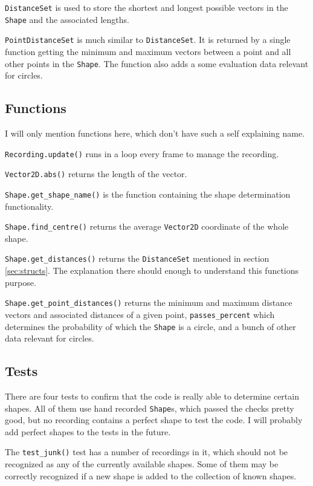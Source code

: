 \documentclass[12pt, a4paper]{article}
\begin{document}
{                \texttt{DistanceSet} is used to store the shortest and longest possible vectors in the \texttt{Shape} and the associated lengths.\break

                \texttt{PointDistanceSet} is much similar to \texttt{DistanceSet}. It is returned by a single function getting the minimum and maximum vectors between a point and all other points in the \texttt{Shape}. The function also adds a some evaluation data relevant for circles.

            \subsection{Functions}
                I will only mention functions here, which don't have such a self explaining name.\break

                \texttt{Recording.update()} runs in a loop every frame to manage the recording.\break

                \texttt{Vector2D.abs()} returns the length of the vector.\break

                \texttt{Shape.get\_shape\_name()} is the function containing the shape determination functionality.\break

                \texttt{Shape.find\_centre()} returns the average \texttt{Vector2D} coordinate of the whole shape.\break

                \texttt{Shape.get\_distances()} returns the \texttt{DistanceSet} mentioned in section \ref{sec:structs}. The explanation there should enough to understand this functions purpose.\break

                \texttt{Shape.get\_point\_distances()} returns the minimum and maximum distance vectors and associated distances of a given point, \texttt{passes\_percent} which determines the probability of which the \texttt{Shape} is a circle, and a bunch of other data relevant for circles.

        }
        \subsection{Tests}
            There are four tests to confirm that the code is really able to determine certain shapes. All of them use hand recorded \texttt{Shape}s, which passed the checks pretty good, but no recording contains a perfect shape to test the code. I will probably add perfect shapes to the tests in the future.

            The \texttt{test\_junk()} test has a number of recordings in it, which should not be recognized as any of the currently available shapes. Some of them may be correctly recognized if a new shape is added to the collection of known shapes.
\end{document}
